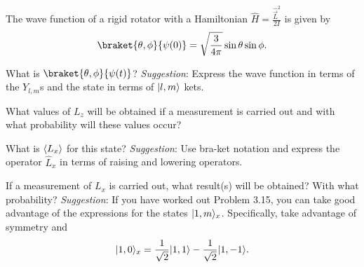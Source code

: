 \documentclass {../phys116}
\begin{document}
\begin {solution}

\end {solution}

\begin {exercise} 
  The wave function of a rigid rotator with a Hamiltonian
  \(\hat H = \frac {\hat {\vec L}^2} {2 I}\) is given by
  \[
    \braket {\theta, \phi} {\psi (0)}
    = \sqrt {\frac 3 {4 \pi}} \sin \theta \sin \phi.
  \]

  \begin {problems}
  \item What is \(\braket {\theta, \phi} {\psi(t)}\)?  \textit
    {Suggestion}: Express the wave function in terms of the
    \(Y_{l, m}\)s and the state in terms of \(\lvert l, m\rangle\) kets.

  \item What values of \(L_z\) will be obtained if a measurement is
    carried out and with what probability will these values occur?

  \item What is \(\langle L_x\rangle\) for this state?  \textit {Suggestion}:
    Use bra-ket notation and express the operator \(\hat L_x\) in
    terms of raising and lowering operators.

  \item If a measurement of \(L_x\) is carried out, what result(s)
    will be obtained?  With what probability?  \textit {Suggestion}:
    If you have worked out Problem 3.15, you can take good advantage
    of the expressions for the states \(\lvert1, m\rangle_x\).
    Specifically, take advantage of symmetry and
    \[
      \lvert1, 0\rangle_x
      = \frac 1 {\sqrt 2} \lvert1, 1\rangle
      - \frac 1 {\sqrt 2} \lvert1, -1\rangle.
    \]
  \end {problems}
\end {exercise}

\begin {solution}

\end {solution}
\end{document}
